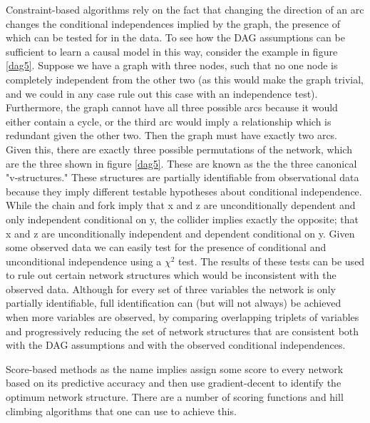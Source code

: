 \documentclass{article}
\begin{document}
Constraint-based algorithms rely on the fact that changing the direction of an arc changes the conditional independences implied by the graph, the presence of which can be tested for in the data. To see how the DAG assumptions can be sufficient to learn a causal model in this way, consider the example in figure \ref{dag5}. Suppose we have a graph with three nodes, such that no one node is completely independent from the other two (as this would make the graph trivial, and we could in any case rule out this case with an independence test). Furthermore, the graph cannot have all three possible arcs because it would either contain a cycle, or the third arc would imply a relationship which is redundant given the other two. Then the graph must have exactly two arcs. Given this, there are exactly three possible permutations of the network, which are the three shown in figure \ref{dag5}. These are known as the the three canonical "v-structures." \parencite{pearl2014probabilistic} These structures are partially identifiable from observational data because they imply different testable hypotheses about conditional independence. While the chain and fork imply that x and z are unconditionally dependent and only independent conditional on y, the collider implies exactly the opposite; that x and z are unconditionally independent and dependent conditional on y. Given some observed data we can easily test for the presence of conditional and unconditional independence using a $\chi^2$ test. The results of these tests can be used to rule out certain network structures which would be inconsistent with the observed data. Although for every set of three variables the network is only partially identifiable, full identification can (but will not always) be achieved when more variables are observed, by comparing overlapping triplets of variables and progressively reducing the set of network structures that are consistent both with the DAG assumptions and with the observed conditional independences.

Score-based methods as the name implies assign some score to every network based on its predictive accuracy and then use gradient-decent to identify the optimum network structure. There are a number of scoring functions and hill climbing algorithms that one can use to achieve this. 
\end{document}
